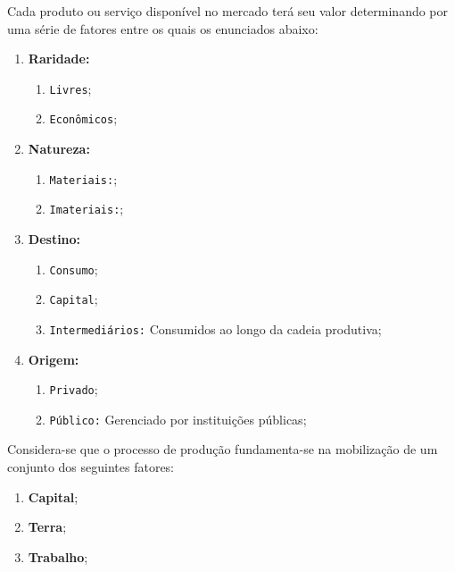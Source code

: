 \documentclass{article}
\begin{document}
            Cada produto ou serviço disponível no mercado terá seu valor determinando por uma série de fatores entre os quais os enunciados abaixo:
                \begin{enumerate}
                    \item \textbf{Raridade:}
                        \begin{enumerate}[noitemsep]
                            \item \texttt{Livres};
                            \item \texttt{Econômicos};
                        \end{enumerate}

                    \item \textbf{Natureza:}
                        \begin{enumerate}[noitemsep]
                            \item \texttt{Materiais:};
                            \item \texttt{Imateriais:};
                        \end{enumerate}

                    \item \textbf{Destino:}
                        \begin{enumerate}[noitemsep]
                            \item \texttt{Consumo};
                            \item \texttt{Capital};
                            \item \texttt{Intermediários:} Consumidos ao longo da cadeia produtiva;
                        \end{enumerate}

                    \item \textbf{Origem:}
                        \begin{enumerate}[noitemsep]
                            \item \texttt{Privado};
                            \item \texttt{Público:} Gerenciado por instituições públicas;
                        \end{enumerate}
                \end{enumerate}
            Considera-se que o processo de produção fundamenta-se na mobilização de um conjunto dos seguintes fatores:
                \begin{enumerate}[noitemsep]
                    \item \textbf{Capital};
                    \item \textbf{Terra};
                    \item \textbf{Trabalho};
                \end{enumerate}
\end{document}
